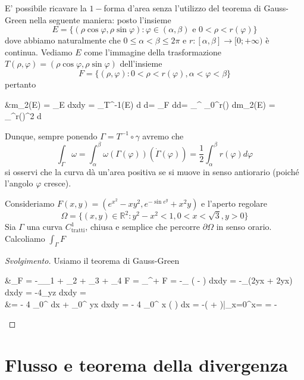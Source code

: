 \begin{remark}
	E' possibile ricavare la $1-$forma d'area senza l'utilizzo del teorema di Gauss-Green nella seguente maniera: posto l'insieme
	$$
	E = \{(\rho \cos{\varphi}, \rho \sin{\varphi}): \varphi \in (\alpha, \beta) \text{ e } 0 < \rho < r(\varphi) \}
	$$
	dove abbiamo naturalmente che $0 \leq \alpha < \beta \leq 2\pi$ e $r: [\alpha, \beta] \to [0; +\infty)$ è continua. Vediamo $E$ come l'immagine della trasformazione $T(\rho, \varphi) = (\rho \cos{\varphi}, \rho \sin{\varphi})$ dell'insieme
	$$
	F = \{(\rho, \varphi) : 0 < \rho < r(\varphi), \alpha < \varphi < \beta \}
	$$
	pertanto
	\begin{flalign*}
	&m_2(E) = \int_E dxdy = \int_{T^{-1}(E)} \rho d \rho d\varphi = \int_{F} \rho d\rho d\varphi = \int_{\alpha}^{\beta} \int_0^{r(\varphi)} \rho d\rho \implies m_2(E) =  \int_\alpha^\beta r(\varphi)^2 d\varphi
	\end{flalign*}
	Dunque, sempre ponendo $\Gamma = T^{-1} \circ \gamma$ avremo che
	$$
	\int_\Gamma \omega = \int_\alpha^\beta \omega(\Gamma(\varphi))(\dot{\Gamma}(\varphi)) = \frac{1}{2} \int_{\alpha}^{\beta} r(\varphi) d\varphi
	$$
	si osservi che la curva dà un'area positiva se si muove in senso antiorario (poiché l'angolo $\varphi$ cresce).
\end{remark}
\begin{exercise}
Consideriamo $F(x, y) = (e^{x^2}-xy^2, e^{-\sin{e^y}} + x^2 y)$ e l'aperto regolare
$$
\Omega = \{(x, y) \in \mathbb{R}^2 : y^2 - x^2 < 1, 0 < x < \sqrt{3}, y > 0 \}
$$
Sia $\Gamma$ una curva $C^1_\text{tratti}$, chiusa e semplice che percorre $\partial \Omega$ in senso orario. Calcoliamo $\int_\Gamma F$
\end{exercise}
\begin{proof}[Svolgimento]
	Usiamo il teorema di Gauss-Green
	\begin{flalign*}
	&\int_\Gamma F = -\int_{\gamma_1 + \gamma_2 + \gamma_3 + \gamma_4} F = \int_{\partial^{+} \Omega} F = -\int_{\Omega} \left(  -  \right) dxdy = -\int_\Omega (2yx + 2yx) dxdy = -4\int_\Omega yz dxdy = \\
	&= - 4 \int_0^{} dx + \int_0^{} yx dxdy = - 4 \int_0^{} x \left(  \right) dx = -\left(  +  \right)\Bigg|_{x=0}^{x=} = - \frac{15}{2}
\end{flalign*}
\end{proof}
\section{Flusso e teorema della divergenza}

